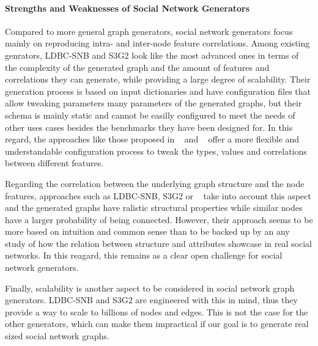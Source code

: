 \paragraph{Strengths and Weaknesses of Social Network Generators}
Compared to more general graph generators, social network generators focus
mainly on reproducing intra- and inter-node feature correlations.
Among existing genrators, LDBC-SNB and S3G2 look
like the most advanced ones in terms of the complexity of the generated graph
and the amount of features and correlations they can generate, while providing a
large degree of scalability. Their generation process is based on input dictionaries and have configuration files that
allow tweaking parameters many parameters of the generated graphs, but their schema is mainly
static and cannot be easilly configured to meet the needs of other uses cases
besides the benchmarks they have been designed for. In this regard, the approaches
like those proposed in ~\cite{Nettleton2016} and ~\cite{Sukthankar-SocialInfo2014} offer a
more flexible and understandable configuration process to tweak the types,
values and correlations between different features.

Regarding the correlation between the underlying graph structure and the node
features, approaches such as LDBC-SNB, S3G2 or ~\cite{Nettleton2016}
take into account this aspect and the generated graphs have ralistic
structural properties while similar nodes have a larger probability of being
connected. However, their approach seems to be more based on
intuition and common sense than to be backed up by an any study of how the
relation between structure and attributes showcase in real social networks. In
this reagard, this remains as a clear open challenge for social network
generators.

Finally, scalability is another aspect to be considered in social network graph
generators. LDBC-SNB and S3G2 are engineered with this in mind, thus they
provide a way to scale to billions of nodes and edges. This is not the case for
the other generators, which can make them impractical if our goal is to generate
real sized social network graphs.


